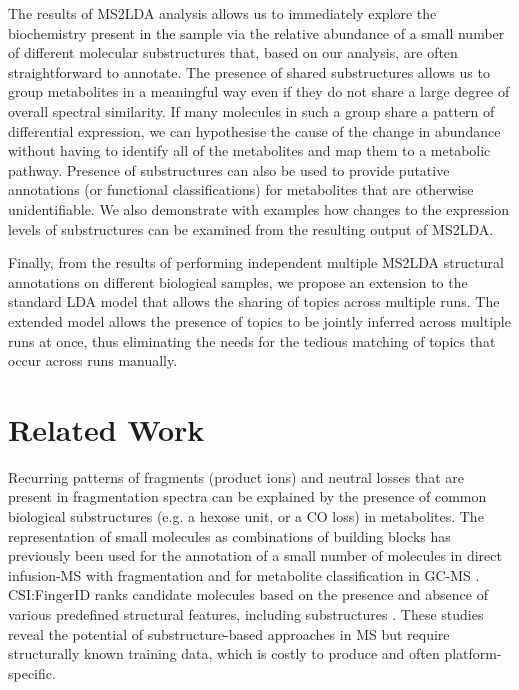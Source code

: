 The results of MS2LDA analysis allows us to immediately explore the biochemistry present in the sample via the relative abundance of a small number of different molecular substructures that, based on our analysis, are often straightforward to annotate. The presence of shared substructures allows us to group metabolites in a meaningful way even if they do not share a large degree of overall spectral similarity. If many molecules in such a group share a pattern of differential expression, we can hypothesise the cause of the change in abundance without having to identify all of the metabolites and map them to a metabolic pathway. Presence of substructures can also be used to provide putative annotations (or functional classifications) for metabolites that are otherwise unidentifiable. We also demonstrate with examples how changes to the expression levels of substructures can be examined from the resulting output of MS2LDA. 

Finally, from the results of performing independent multiple MS2LDA structural annotations on different biological samples, we propose an extension to the standard LDA model that allows the sharing of topics across multiple runs. The extended model allows the presence of topics to be jointly inferred across multiple runs at once, thus eliminating the needs for the tedious matching of topics that occur across runs manually.

\section{Related Work}

Recurring patterns of fragments (product ions) and neutral losses that are present in fragmentation spectra can be explained by the presence of common biological substructures (e.g. a hexose unit, or a CO loss) in metabolites. The representation of small molecules as combinations of building blocks has previously been used for the annotation of a small number of molecules in direct infusion-MS with fragmentation \cite{Sweeney2014} and for metabolite classification in GC-MS \cite{Scott1994, Hummel2010}. CSI:FingerID ranks candidate molecules based on the presence and absence of various predefined structural features, including substructures \cite{Duhrkop2015}. These studies reveal the potential of substructure-based approaches in MS but require structurally known training data, which is costly to produce and often platform-specific. 

